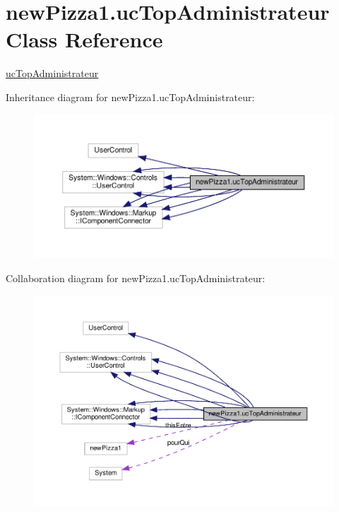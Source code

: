 \hypertarget{classnewPizza1_1_1ucTopAdministrateur}{}\section{new\+Pizza1.\+uc\+Top\+Administrateur Class Reference}
\label{classnewPizza1_1_1ucTopAdministrateur}


\hyperlink{classnewPizza1_1_1ucTopAdministrateur}{uc\+Top\+Administrateur}  




Inheritance diagram for new\+Pizza1.\+uc\+Top\+Administrateur\+:
\nopagebreak
\begin{figure}[H]
\begin{center}
\leavevmode
\includegraphics[width=350pt]{classnewPizza1_1_1ucTopAdministrateur__inherit__graph}
\end{center}
\end{figure}


Collaboration diagram for new\+Pizza1.\+uc\+Top\+Administrateur\+:
\nopagebreak
\begin{figure}[H]
\begin{center}
\leavevmode
\includegraphics[width=350pt]{classnewPizza1_1_1ucTopAdministrateur__coll__graph}
\end{center}
\end{figure}
